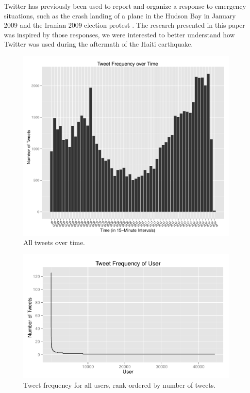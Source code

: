 \documentclass[a4paper, 11pt, titlepage]{article}
\begin{document}
Twitter has previously been used to report and organize a response to emergency situations, such as the crash landing of a plane in the Hudson Bay in January 2009 \cite{Deards2009} and the Iranian 2009 election protest \cite{Grossman2009}.  The research presented in this paper was inspired by those responses, we were interested to better understand how Twitter was used during the aftermath of the Haiti earthquake.

\begin{figure}[h!]
\centering
\includegraphics[width=120mm]{../figures/all_tweets_over_time}
\caption{All tweets over time.}
\label{fig:all_tweets_over_time}
\end{figure}

\begin{figure}[h!]
\centering
\includegraphics[width=120mm]{../figures/all_tweets_by_users}
\caption{Tweet frequency for all users, rank-ordered by number of tweets.}
\label{fig:all_tweets_by_users}
\end{figure}
\end{document}

